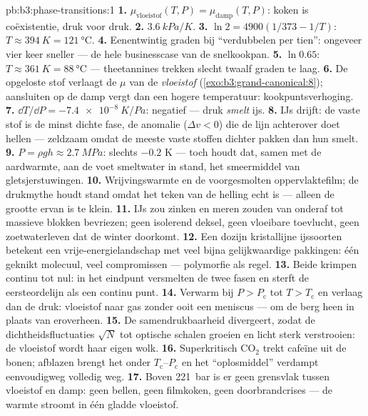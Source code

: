 \begin{solution}{pb:b3:phase-transitions:1}
\textbf{1.} $\mu_{\text{vloeistof}}(T, P) = \mu_{\text{damp}}(T,
P)$: koken is coëxistentie, druk voor druk.
\textbf{2.} $\qty{3.6}{kPa/K}$.
\textbf{3.} $\ln2 = 4900(1/373 - 1/T)$: $T \approx \qty{394}{K} =
\qty{121}{\celsius}$.
\textbf{4.} Eenentwintig graden bij ``verdubbelen per tien'': ongeveer vier
keer sneller --- de hele businesscase van de snelkookpan.
\textbf{5.} $\ln0.65$: $T \approx \qty{361}{K} =
\qty{88}{\celsius}$ --- theetannines trekken slecht twaalf graden
te laag.
\textbf{6.} De opgeloste stof verlaagt de $\mu$ van de \emph{vloeistof}
(\cref{exo:b3:grand-canonical:8}); aansluiten op de damp vergt dan
een hogere temperatuur: kookpuntsverhoging.
\textbf{7.} $\dd T/\dd P = \qty{-7.4e-8}{K/Pa}$: negatief ---
druk \emph{smelt} ijs.
\textbf{8.} IJs drijft: de vaste stof is de minst dichte fase, de
anomalie ($\Delta v < 0$) die de lijn achterover doet hellen --- zeldzaam
omdat de meeste vaste stoffen dichter pakken dan hun smelt.
\textbf{9.} $P = \rho gh \approx \qty{2.7}{MPa}$: slechts
$-0.2$ K --- toch houdt dat, samen met de aardwarmte, aan de voet
smeltwater in stand, het smeermiddel van gletsjerstuwingen.
\textbf{10.} Wrijvingswarmte en de voorgesmolten oppervlaktefilm;
de drukmythe houdt stand omdat het teken van de helling echt is
--- alleen de grootte ervan is te klein.
\textbf{11.} IJs zou zinken en meren zouden van onderaf tot massieve
blokken bevriezen; geen isolerend deksel, geen vloeibare toevlucht, geen
zoetwaterleven dat de winter doorkomt.
\textbf{12.} Een dozijn kristallijne ijssoorten betekent een
vrije-energielandschap met veel bijna gelijkwaardige pakkingen: één geknikt molecuul,
veel compromissen --- polymorfie als regel.
\textbf{13.} Beide krimpen continu tot nul: in het eindpunt
versmelten de twee fasen en sterft de eersteordelijn als een
continu punt.
\textbf{14.} Verwarm bij $P > P_{\text{c}}$ tot $T > T_{\text{c}}$
en verlaag dan de druk: vloeistof naar gas zonder ooit een meniscus --- om
de berg heen in plaats van eroverheen.
\textbf{15.} De samendrukbaarheid divergeert, zodat de
dichtheidsfluctuaties $\sqrt N$ tot optische schalen groeien en licht sterk verstrooien:
de vloeistof wordt haar eigen wolk.
\textbf{16.} Superkritisch CO$_2$ trekt cafeïne uit de bonen;
afblazen brengt het onder $T_{\text{c}}$--$P_{\text{c}}$ en het
``oplosmiddel'' verdampt eenvoudigweg volledig weg.
\textbf{17.} Boven \qty{221}{bar} is er geen grensvlak tussen
vloeistof en damp: geen bellen, geen filmkoken, geen doorbrandcrises ---
de warmte stroomt in één gladde vloeistof.

\end{solution}
